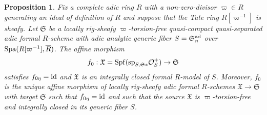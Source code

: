 \documentclass[12pt,twoside,a4paper]{article}
\newtheorem{prop}[thm]{Proposition}
\theoremstyle{definition}
\theoremstyle{remark}
\newcommand\ad{{\rm ad}}
\newcommand\id{{\rm id}}
\newcommand\spc{{\rm sp}}
\newcommand\Spa{{\rm Spa}}
\newcommand\Spf{{\rm Spf}}
\begin{document}
\begin{prop}\label{Normalization of a formal model}Fix a complete adic ring $R$ with a non-zero-divisor $\varpi\in R$ generating an ideal of definition of $R$ and suppose that the Tate ring $R[\varpi^{-1}]$ is sheafy. Let $\mathfrak{S}$ be a locally rig-sheafy $\varpi$-torsion-free quasi-compact quasi-separated adic formal $R$-scheme with adic analytic generic fiber $S=\mathfrak{S}_{\eta}^{\ad}$ over $\Spa(R[\varpi^{-1}], \overline{R})$. The affine morphism \begin{equation*}f_{0}: \mathfrak{X}=\Spf(\spc_{S,\mathfrak{S}\ast}\mathcal{O}_{S}^{+})\to \mathfrak{S}\end{equation*}satisfies $f_{0\eta}=\id$ and $\mathfrak{X}$ is an integrally closed formal $R$-model of $S$. Moreover, $f_{0}$ is the unique affine morphism of locally rig-sheafy adic formal $R$-schemes $\mathfrak{X}\to\mathfrak{S}$ with target $\mathfrak{S}$ such that $f_{0\eta}=\id$ and such that the source $\mathfrak{X}$ is $\varpi$-torsion-free and integrally closed in its generic fiber $S$.\end{prop}
\end{document}
